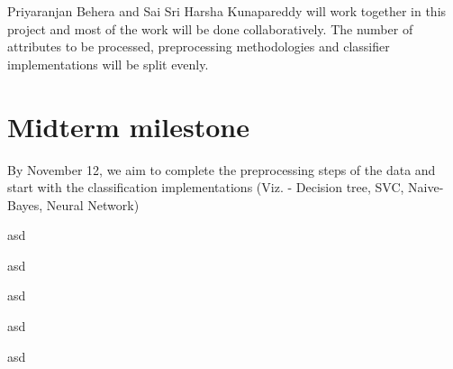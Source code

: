 \documentclass{article} %
\begin{document}
Priyaranjan Behera and Sai Sri Harsha Kunapareddy will work together in this project and most of the work will be done collaboratively. The number of attributes to be processed, preprocessing methodologies and classifier implementations will be split evenly. 

\section{Midterm milestone}

By November 12, we aim to complete the preprocessing steps of the data and start with the classification implementations (Viz. - Decision tree, SVC, Naive-Bayes, Neural Network) 


asd

asd

asd

asd

asd
\end{document}
